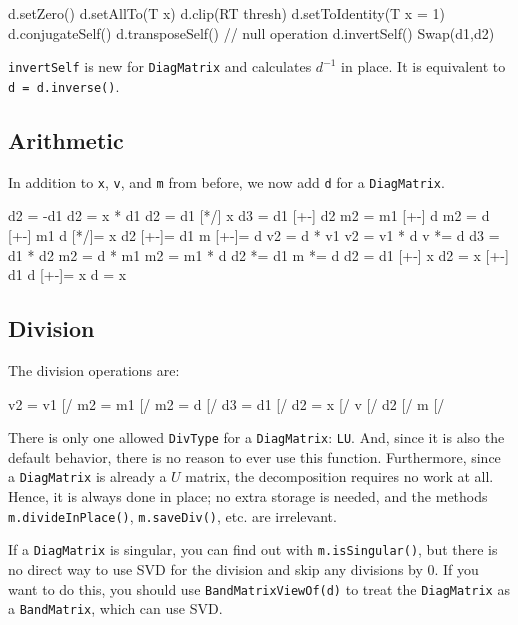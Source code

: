 \documentclass[twoside,letterpaper,11pt]{article}
\renewcommand{\tt}[1]{{\lstinline {#1}}}
\begin{document}
\begin{tmvcode}
d.setZero()
d.setAllTo(T x)
d.clip(RT thresh)
d.setToIdentity(T x = 1)
d.conjugateSelf()
d.transposeSelf() // null operation
d.invertSelf()
Swap(d1,d2)
\end{tmvcode}
\tt{invertSelf} is new for \tt{DiagMatrix} and calculates $d^{-1}$ in place.  
It is equivalent to \tt{d = d.inverse()}.

\subsection{Arithmetic}
\label{DiagMatrix_Arithmetic}

In addition to \tt{x}, \tt{v}, and \tt{m} from before, we now add \tt{d} for a \tt{DiagMatrix}.

\begin{tmvcode}
d2 = -d1
d2 = x * d1
d2 = d1 [*/] x
d3 = d1 [+-] d2
m2 = m1 [+-] d
m2 = d [+-] m1
d [*/]= x
d2 [+-]= d1
m [+-]= d
v2 = d * v1
v2 = v1 * d
v *= d
d3 = d1 * d2
m2 = d * m1
m2 = m1 * d
d2 *= d1
m *= d
d2 = d1 [+-] x
d2 = x [+-] d1
d [+-]= x
d = x
\end{tmvcode}

\subsection{Division}
\label{DiagMatrix_Division}

The division operations are:
\begin{tmvcode}
v2 = v1 [/%
m2 = m1 [/%
m2 = d [/%
d3 = d1 [/%
d2 = x [/%
v [/%
d2 [/%
m [/%
\end{tmvcode}

There is only one allowed \tt{DivType} for a \tt{DiagMatrix}: \tt{LU}. 
And, since it is also the default behavior,
there is no reason to ever use this function.  Furthermore, since a \tt{DiagMatrix}
is already a $U$ matrix, the decomposition requires no work at all.
Hence, it is always done in place; no extra storage is needed, and 
the methods \tt{m.divideInPlace()}, \tt{m.saveDiv()}, etc. are irrelevant.

If a \tt{DiagMatrix} is singular, you can find out with \tt{m.isSingular()},
but there is no direct way to use SVD for the division and skip any
divisions by 0.  If you want to do this, you should use \tt{BandMatrixViewOf(d)} to 
treat the \tt{DiagMatrix} as a \tt{BandMatrix}, which can use SVD.
\end{document}
